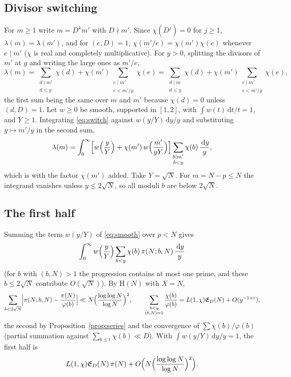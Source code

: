 \documentclass[11pt]{amsart}
\theoremstyle{definition}
\theoremstyle{remark}
\newcommand{\e}{\varepsilon}
\newcommand{\dd}{\,\mathrm d}
\newcommand{\sE}{\mathfrak E}
\begin{document}
\subsection{Divisor switching}
For $m\ge1$ write $m=D^km'$ with $D\nmid m'$. Since $\chi(D^j)=0$ for $j\ge1$, $\lambda(m)=\lambda(m')$, and for $(e,D)=1$, $\chi(m'/e)=\chi(m')\chi(e)$ whenever $e\mid m'$ ($\chi$ is real and completely multiplicative). For $y>0$, splitting the divisors of $m'$ at $y$ and writing the large ones as $m'/e$,
\begin{equation}\label{eq:switch}
\lambda(m)=\sum_{\substack{d\mid m'\\ d\le y}}\chi(d)+\chi(m')\sum_{\substack{e\mid m'\\ e<m'/y}}\chi(e)
=\sum_{\substack{d\mid m\\ d\le y}}\chi(d)+\chi(m')\sum_{\substack{e\mid m'\\ e<m'/y}}\chi(e),
\end{equation}
the first sum being the same over $m$ and $m'$ because $\chi(d)=0$ unless $(d,D)=1$. Let $w\ge0$ be smooth, supported in $[1,2]$, with $\int w(t)\dd t/t=1$, and $Y\ge1$. Integrating \eqref{eq:switch} against $w(y/Y)\dd y/y$ and substituting $y\mapsto m'/y$ in the second sum,
\begin{equation}\label{eq:smooth}
\lambda(m)=\int_0^\infty\Bigl[w\Bigl(\frac yY\Bigr)+\chi(m')\,w\Bigl(\frac{m'}{yY}\Bigr)\Bigr]\sum_{\substack{b\mid m'\\ b<y}}\chi(b)\,\frac{\dd y}y ,
\end{equation}
which is \cite[(2.3)]{FI18} with the factor $\chi(m')$ added. Take $Y=\sqrt N$. For $m=N-p\le N$ the integrand vanishes unless $y\le2\sqrt N$, so all moduli $b$ are below $2\sqrt N$.

\subsection{The first half}
Summing the term $w(y/Y)$ of \eqref{eq:smooth} over $p<N$ gives
\[
\int_0^\infty w\Bigl(\frac yY\Bigr)\sum_{b<y}\chi(b)\,\pi(N;b,N)\,\frac{\dd y}y
\]
(for $b$ with $(b,N)>1$ the progression contains at most one prime, and these $b\le2\sqrt N$ contribute $O(\sqrt N)$). By $\mathrm H(N)$ with $X=N$,
\[
\sum_{b<2\sqrt N}\Bigl|\pi(N;b,N)-\frac{\pi(N)}{\varphi(b)}\Bigr|\ll N\Bigl(\frac{\log\log N}{\log N}\Bigr)^2,\qquad
\sum_{\substack{b<y\\ (b,N)=1}}\frac{\chi(b)}{\varphi(b)}=L(1,\chi)\sE_D(N)+O(y^{-1+\e}),
\]
the second by Proposition~\ref{prop:series} and the convergence of $\sum\chi(b)/\varphi(b)$ (partial summation against $\sum_{b\le t}\chi(b)\ll D$). With $\int w(y/Y)\dd y/y=1$, the first half is
\[
L(1,\chi)\sE_D(N)\,\pi(N)+O\Bigl(N\Bigl(\frac{\log\log N}{\log N}\Bigr)^2\Bigr).
\]
\end{document}
